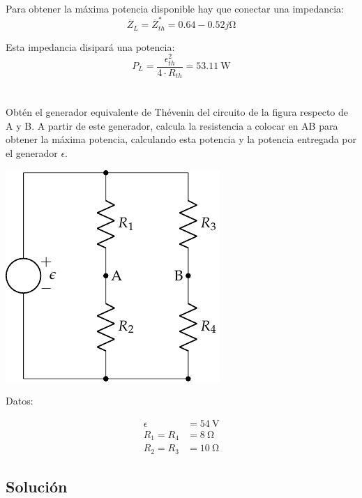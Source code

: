 \documentclass[12pt]{article}
\begin{document}
Para obtener la máxima potencia disponible hay que conectar una impedancia:
\begin{equation*}
\overline{Z}_L = \overline{Z}^*_{th} = 0.64-0.52j\si{\ohm}
\end{equation*}

Esta impedancia disipará una potencia:
\begin{equation*}
P_L = \frac{\epsilon_{th}^2}{4 \cdot R_{th}} = \SI{53.11}{\watt}
\end{equation*}

\clearpage

\section{}

Obtén el generador equivalente de Thévenin del circuito de la figura respecto de A y B. A partir de este generador, calcula la resistencia a colocar en AB para obtener la máxima potencia, calculando esta potencia y la potencia entregada por el generador $\epsilon$.

\begin{center}
\includegraphics{figs/Thevenin2}
\end{center}

Datos:

\begin{align*}
  \epsilon &= \SI{54}{\volt}\\
  R_1 = R_4 &= \SI{8}{\ohm}\\
  R_2 = R_3 &= \SI{10}{\ohm}
\end{align*}

\noindent\hrulefill

\subsection*{Solución}
\end{document}
